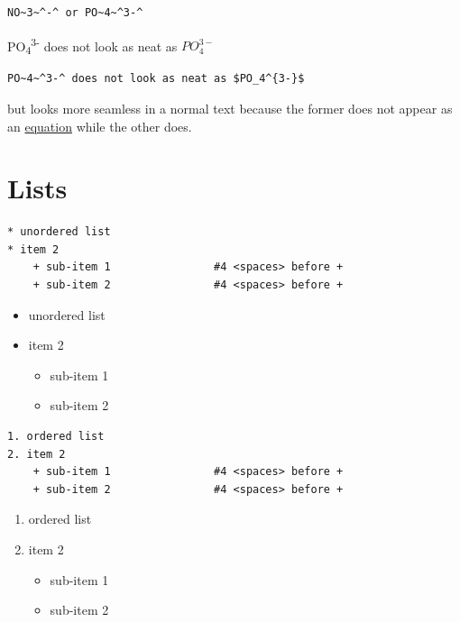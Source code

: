 \documentclass[]{book}
\providecommand{\tightlist}{%
  \setlength{\itemsep}{0pt}\setlength{\parskip}{0pt}}
\theoremstyle{definition}
\theoremstyle{definition}
\theoremstyle{definition}
\theoremstyle{remark}
\begin{document}
\begin{verbatim}
NO~3~^-^ or PO~4~^3-^
\end{verbatim}

PO\textsubscript{4}\textsuperscript{3-} does not look as neat as
\(PO_4^{3-}\)

\begin{verbatim}
PO~4~^3-^ does not look as neat as $PO_4^{3-}$
\end{verbatim}

but looks more seamless in a normal text because the former does not
appear as an \protect\hyperlink{inline-equations}{equation} while the
other does.

\section{Lists}\label{lists}

\begin{verbatim}
* unordered list
* item 2
    + sub-item 1                #4 <spaces> before +
    + sub-item 2                #4 <spaces> before +
\end{verbatim}

\begin{itemize}
\tightlist
\item
  unordered list
\item
  item 2

  \begin{itemize}
  \tightlist
  \item
    sub-item 1
  \item
    sub-item 2
  \end{itemize}
\end{itemize}

\begin{verbatim}
1. ordered list
2. item 2
    + sub-item 1                #4 <spaces> before +
    + sub-item 2                #4 <spaces> before +
\end{verbatim}

\begin{enumerate}
\def\labelenumi{\arabic{enumi}.}
\tightlist
\item
  ordered list
\item
  item 2

  \begin{itemize}
  \tightlist
  \item
    sub-item 1
  \item
    sub-item 2
  \end{itemize}
\end{enumerate}
\end{document}
